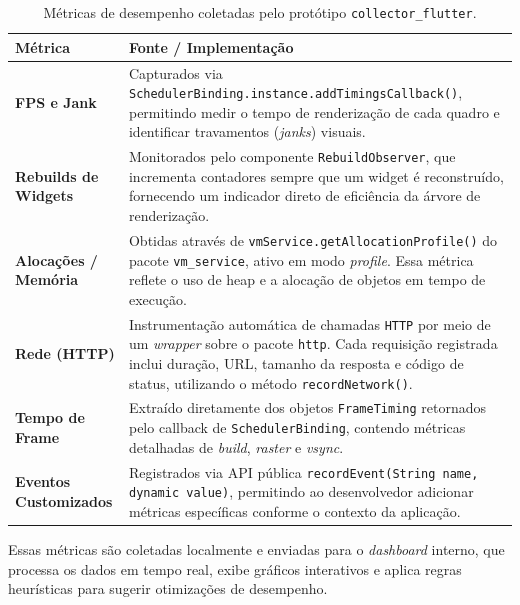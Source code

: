 \documentclass[12pt,a4paper,oneside]{abntex2}
\begin{document}
\begin{table}[H]
\centering
\caption{Métricas de desempenho coletadas pelo protótipo \texttt{collector\_flutter}.}
\label{tab:metricas-coleta}
\renewcommand{\arraystretch}{1.4} %
\begin{tabular}{p{4cm} p{11cm}}
\toprule
\textbf{Métrica} & \textbf{Fonte / Implementação} \\ 
\midrule

\textbf{FPS e Jank} &
Capturados via \texttt{SchedulerBinding.instance.addTimingsCallback()}, permitindo medir o tempo de renderização de cada quadro e identificar travamentos (\textit{janks}) visuais. \\[0.5em]

\textbf{Rebuilds de Widgets} &
Monitorados pelo componente \texttt{RebuildObserver}, que incrementa contadores sempre que um widget é reconstruído, fornecendo um indicador direto de eficiência da árvore de renderização. \\[0.5em]

\textbf{Alocações / Memória} &
Obtidas através de \texttt{vmService.getAllocationProfile()} do pacote \texttt{vm\_service}, ativo em modo \textit{profile}. Essa métrica reflete o uso de heap e a alocação de objetos em tempo de execução. \\[0.5em]

\textbf{Rede (HTTP)} &
Instrumentação automática de chamadas \texttt{HTTP} por meio de um \textit{wrapper} sobre o pacote \texttt{http}. Cada requisição registrada inclui duração, URL, tamanho da resposta e código de status, utilizando o método \texttt{recordNetwork()}. \\[0.5em]

\textbf{Tempo de Frame} &
Extraído diretamente dos objetos \texttt{FrameTiming} retornados pelo callback de \texttt{SchedulerBinding}, contendo métricas detalhadas de \textit{build}, \textit{raster} e \textit{vsync}. \\[0.5em]

\textbf{Eventos Customizados} &
Registrados via API pública \texttt{recordEvent(String name, dynamic value)}, permitindo ao desenvolvedor adicionar métricas específicas conforme o contexto da aplicação. \\

\bottomrule
\end{tabular}
\end{table}


Essas métricas são coletadas localmente e enviadas para o \textit{dashboard} interno, que processa os dados em tempo real, exibe gráficos interativos e aplica regras heurísticas para sugerir otimizações de desempenho.
\end{document}
